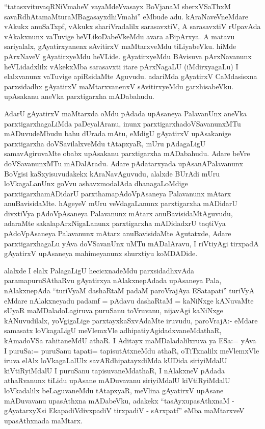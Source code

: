 
\begin{artha}
``tatasxvituvaqRNiVmaheV vayaMdeVvasayx BoVjanaM sherxVSaThxM savaRdhAtamaMturaMBagasayxdhiVmahi'' eMbude adu. kAraNaveVneMdare vAkukx anuSaTxpf, vAkukx shariVradalilx sarasavxtiV, A sarasavxtiV rUpavAda vAkakxnunx vaTuvige heVLikoDabeVkeMdu avara aBipArxya. A matavu sariyalalx, gAyatirxyanenx sAvitirxV maMtarxveMdu tiLiyabeVku. hiMde pArxNaveV gAyatirxyeMdu heVLide. gAyatirxyeMdu BAvisuva pArxNavanunx heVLidadxlilx vAkekxMba sarasavxti itare pArxNagaLU (iMdirxyagaLu) I elalxvanunx vaTuvige apiRsidaMte Aguvudu. adariMda gAyatirxV CaMdasisxna parxsidadhx gAyatirxV maMtarxvanenxV sAvitirxyeMdu garxhisabeVku. upAsakanu aneVka parxtigarxha mADabahudu. 

AdarU gAyatirxV maMtarxda oMdu pAdada upAsaneya PalavanUnx aneVka parxtigarxhagaLiMda paDeyalAranu, inunx parxtigarxhadoVSavanunxMTu mADuvudeMbudu bahu dUrada mAtu, eMdigU gAyatirxV upAsakanige parxtigarxha doVSavilalxveMdu tAtapxyaR, mUru pAdagaLigU samavAgiruvaMte obabx upAsakanu parxtigarxha mADabahudu. Adare beVre doVSavanunxMTu mADalAradu. Adare pAdatarxyada upAsanAPalavanunx BoVgisi kaSxyisuvudakekx kAraNavAguvudu, alalxde BUrAdi mUru loVkagaLanUnx goVvu ashavxmodalAda dhanagaLoMdige parxtigarxhamADidarU parxthamapAdoVpAsaneya Palavanunx mAtarx anuBavisidaMte. hAgeyeV mUru veVdagaLanunx parxtigarxha mADidarU divxtiVya pAdoVpAsaneya Palavanunx mAtarx anuBavisidaMtAguvudu, adaraMte sakalapArxNigaLanunx parxtigarxha mADidadxrU taqtiVya pAdoVpAsaneya Palavanunx mAtarx anuBavisidaMte Agutatxde, Adare parxtigarxhagaLu yAva doVSavanUnx uMTu mADalAravu, I riVtiyAgi tirxpadA gAyatirxV upAsaneya mahimeyanunx shurxtiyu koMDADide. 

alalxde I elalx PalagaLigU hecicxnadeMdu parxsidadhxvAda paramapuruSAthaRvu gAyatirxya nAlakxnepAdada upAsaneya Pala, nAlakxnepAda ``turiVyaM dashaRtaM padaM paroVrajAya ESatapati'' turiVyA eMdare nAlakxneyadu padamf = pAdavu dashaRtaM = kaNiNxge kANuvaMte sUyaR maMDaladoLagiruva puruSanu toVruvanu, nijavAgi kaNiNxge kANuvudilalx, yoVgigaLige parxtayxkaSxvAdaMte iruvudu, paroVrajA:- eMdare samasatx loVkagaLigU meVlemxVle adhipatiyAgidadxvaneMdathaR, kAmadoVSa rahitaneMdU athaR. I Aditayx maMDaladalilxruva ya ESa:= yAva I puruSa:= puruSanu tapati= tapisutAtxneMdu athaR, oTiTxnalilx meVlemxVle iruva elAlx loVkagaLalUlx savARdhipatayxdiMda kUDida siriyiMdalU kiVtiRyiMdalU I puruSanu tapisuvaneMdathaR, I nAlakxneV pAdada athaRvanunx tiLidu upAsane mADuvavanu siriyiMdalU kiVtiRyiMdalU loVkadalilx beLaguvaneMdu tAtapxyaR, meVlina gAyatirxV upAsane mADuvavanu upasAthxna mADabeVku, adakekx ``tasAyxupasAthxnaM - gAyatarxyXsi EkapadiVdivxpadiV tirxpadiV - sArxpatf'' eMba maMtarxveV upasAthxnada maMtarx. 


\end{artha}
